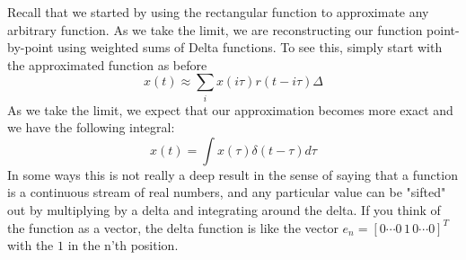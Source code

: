 Recall that we started by using the rectangular function to approximate any arbitrary function.  As we take the limit, we are reconstructing our function point-by-point using weighted sums of Delta functions.  To see this, simply start with the approximated  function as before
    \begin{equation}
        x(t) \approx \sum_i x(i\tau) r(t - i\tau) \Delta
    \end{equation}
As we take the limit, we expect that our approximation becomes more exact and we have the following integral:
    \begin{equation}
        x\left(t\right)=\int x\left(\tau\right)\delta\left(t-\tau\right)d\tau
    \end{equation}
In some ways this is not really a deep result in the sense of  saying that a function is a continuous stream of real numbers, and any particular value can be "sifted" out by multiplying by a delta and integrating around the delta.  If you think of the function as a vector, the delta function is like the vector $e_n = [0 \cdots 0\, 1\, 0 \cdots 0 ]^T$ with the $1$ in the n'th position. 
